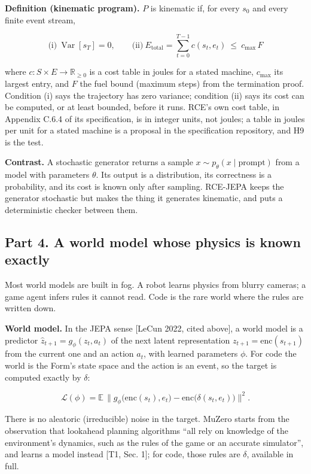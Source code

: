 \documentclass[10pt,letterpaper]{article}
\begin{document}
\textbf{Definition (kinematic program).} \(P\) is kinematic if, for
every \(s_0\) and every finite event stream,

\[
\text{(i)}\ \operatorname{Var}[s_T]=0,\qquad \text{(ii)}\ E_{\text{total}}=\sum_{t=0}^{T-1}c(s_t,e_t)\ \le\ c_{\max}\,F
\]

where \(c: S\times E\to\mathbb{R}_{\ge0}\) is a cost table in joules for
a stated machine, \(c_{\max}\) its largest entry, and \(F\) the fuel
bound (maximum steps) from the termination proof. Condition (i) says the
trajectory has zero variance; condition (ii) says its cost can be
computed, or at least bounded, before it runs. RCE's own cost table, in
Appendix C.6.4 of its specification, is in integer units, not joules; a
table in joules per unit for a stated machine is a proposal in the
specification repository, and H9 is the test.

\textbf{Contrast.} A stochastic generator returns a sample
\(x\sim p_\theta(x\mid\text{prompt})\) from a model with parameters
\(\theta\). Its output is a distribution, its correctness is a
probability, and its cost is known only after sampling. RCE-JEPA keeps
the generator stochastic but makes the thing it generates kinematic, and
puts a deterministic checker between them.

\subsection{Part 4. A world model whose physics is known
exactly}\label{part-4.-a-world-model-whose-physics-is-known-exactly}

Most world models are built in fog. A robot learns physics from blurry
cameras; a game agent infers rules it cannot read. Code is the rare
world where the rules are written down.

\textbf{World model.} In the JEPA sense {[}LeCun 2022, cited above{]}, a
world model is a predictor \(\hat z_{t+1}=g_\phi(z_t,a_t)\) of the next
latent representation \(z_{t+1}=\mathrm{enc}(s_{t+1})\) from the current
one and an action \(a_t\), with learned parameters \(\phi\). For code
the world is the Form's state space and the action is an event, so the
target is computed exactly by \(\delta\):

\[
\mathcal{L}(\phi)=\mathbb{E}\,\big\lVert g_\phi\big(\mathrm{enc}(s_t),e_t\big)-\mathrm{enc}\big(\delta(s_t,e_t)\big)\big\rVert^2 .
\]

There is no aleatoric (irreducible) noise in the target. MuZero starts
from the observation that lookahead planning algorithms ``all rely on
knowledge of the environment's dynamics, such as the rules of the game
or an accurate simulator'', and learns a model instead {[}T1, Sec. 1{]};
for code, those rules are \(\delta\), available in full.
\end{document}
